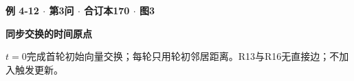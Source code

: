 {\color{ink}\bfseries 例 4-12 \(\cdot \) 第3问 \(\cdot \) 合订本170 \(\cdot \) 图3}\par \textbf{同步交换的时间原点}\par\vspace{2bp}\(t=\allowbreak{}0\)完成首轮初始向量交换；每轮只用轮初邻居距离。R13与R16无直接边；不加入触发更新。
